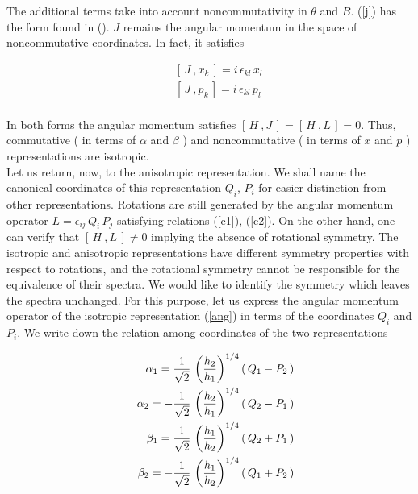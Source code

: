 \documentclass[a4paper,aps,prd,preprint]{revtex4}
\begin{document}
    The additional terms take into account noncommutativity in $\theta$ and $B$.
   (\ref{j}) has the form found in (\cite{nair}). $J$  remains the angular 
   momentum in the space of noncommutative coordinates. In fact, it satisfies 
    
    \begin{eqnarray}
 && \left[\, J\ ,x_k\,\right]= i\,\epsilon_{kl}\,x_l\\
 && \left[\, J\ ,p_k\,\right]= i\,\epsilon_{kl}\,p_l\\
     \end{eqnarray}
    
    
    In both forms the angular momentum satisfies
    $\left[\, H\ , J\, \right]=\left[\, H\ , L\, \right]=0$. 
    Thus, commutative ( in terms of $\alpha$ and $\beta$ ) and
    noncommutative ( in terms of $x$ and $p$ )  representations are isotropic. 
    \\
    Let us return, now, to the anisotropic representation.
    We shall name the canonical coordinates  of this representation
    $Q_i$, $P_i$ for easier distinction from other representations.
    Rotations are still generated by the angular momentum operator 
    $L= \epsilon_{ij}\, Q_i\, P_j$ satisfying relations (\ref{c1}), (\ref{c2}). 
    On the other hand, one can verify that $\left[\, H\ , L\,\right]\ne 0$ 
    implying the absence of rotational symmetry. 
    The  isotropic and anisotropic representations have different symmetry
    properties with respect to rotations, and  the rotational symmetry cannot 
    be responsible for the equivalence of their spectra.
    We would like to identify the symmetry which leaves the spectra unchanged.
    For this purpose, let us express the angular momentum operator of the 
    isotropic representation (\ref{ang}) in terms of the coordinates $Q_i$ and 
    $P_i$. We write down the relation among coordinates of the two 
    representations 
    
    \begin{eqnarray}
    &&\alpha_1= {1\over \sqrt 2}\, \left({h_2\over h_1}\right)^{1/4}\left(\,
    Q_1-P_2\,\right)\\
   &&\alpha_2= -{1\over \sqrt 2}\, \left({h_2\over h_1}\right)^{1/4}\left(\,
    Q_2-P_1\, \right)\\
   &&\beta_1= {1\over \sqrt 2}\, \left({h_1\over h_2}\right)^{1/4}\left(\,
   Q_2+P_1\, \right)\\
   &&\beta_2 = -{1\over \sqrt 2}\, \left({h_1\over h_2}\right)^{1/4}\left(\,
   Q_1+ P_2\, \right)
   \end{eqnarray}
    
\end{document}
